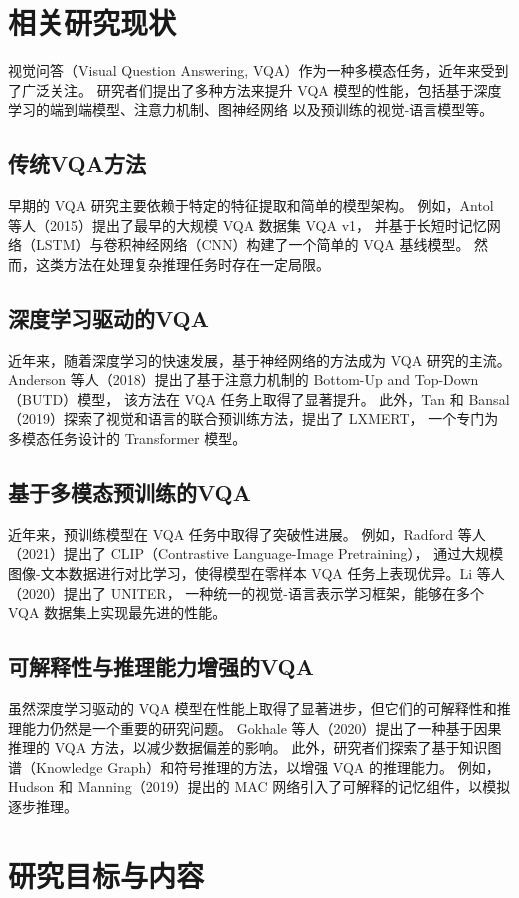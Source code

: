 \section{相关研究现状}
视觉问答（Visual Question Answering, VQA）作为一种多模态任务，近年来受到了广泛关注。
研究者们提出了多种方法来提升 VQA 模型的性能，包括基于深度学习的端到端模型、注意力机制、图神经网络
以及预训练的视觉-语言模型等。
\subsection{传统VQA方法}
早期的 VQA 研究主要依赖于特定的特征提取和简单的模型架构。
例如，Antol 等人（2015）提出了最早的大规模 VQA 数据集 VQA v1，
并基于长短时记忆网络（LSTM）与卷积神经网络（CNN）构建了一个简单的 VQA 基线模型\cite{Antol2015VQA}。
然而，这类方法在处理复杂推理任务时存在一定局限。
\subsection{深度学习驱动的VQA}
近年来，随着深度学习的快速发展，基于神经网络的方法成为 VQA 研究的主流。
Anderson 等人（2018）提出了基于注意力机制的 Bottom-Up and Top-Down（BUTD）模型，
该方法在 VQA 任务上取得了显著提升\cite{Anderson2018BUTD}。
此外，Tan 和 Bansal（2019）探索了视觉和语言的联合预训练方法，提出了 LXMERT，
一个专门为多模态任务设计的 Transformer 模型\cite{Tan2019LXMERT}。
\subsection{基于多模态预训练的VQA}
近年来，预训练模型在 VQA 任务中取得了突破性进展。
例如，Radford 等人（2021）提出了 CLIP（Contrastive Language-Image Pretraining），
通过大规模图像-文本数据进行对比学习，使得模型在零样本 VQA 任务上表现优异\cite{Radford2021CLIP}。Li 等人（2020）提出了 UNITER，
一种统一的视觉-语言表示学习框架，能够在多个 VQA 数据集上实现最先进的性能\cite{Li2020UNITER}。
\subsection{可解释性与推理能力增强的VQA}
虽然深度学习驱动的 VQA 模型在性能上取得了显著进步，但它们的可解释性和推理能力仍然是一个重要的研究问题。
Gokhale 等人（2020）提出了一种基于因果推理的 VQA 方法，以减少数据偏差的影响\cite{Gokhale2020CausalVQA}。
此外，研究者们探索了基于知识图谱（Knowledge Graph）和符号推理的方法，以增强 VQA 的推理能力。
例如，Hudson 和 Manning（2019）提出的 MAC 网络引入了可解释的记忆组件，以模拟逐步推理\cite{Hudson2019MAC}。

\section{研究目标与内容}

